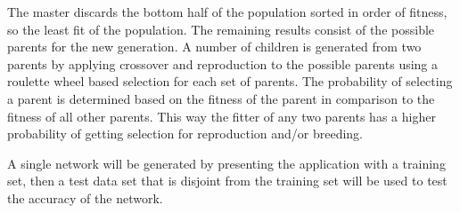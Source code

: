 The master discards the bottom half of the population sorted in order of fitness, so the least fit of the population. 
The remaining results consist of the possible parents for the new generation. 
A number of children is generated from two parents by applying crossover and reproduction to the possible parents using a roulette wheel based selection for each set of parents. 
The probability of selecting a parent is determined based on the fitness of the parent in comparison to the fitness of all other parents. 
This way the fitter of any two parents has a higher probability of getting selection for reproduction and/or breeding.

A single network will be generated by presenting the application with a training set, then a test data set that is disjoint from the training set will be used to test the accuracy of the network.  
